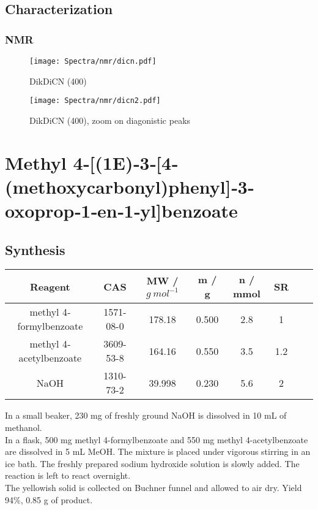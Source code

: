 \documentclass[../Master.tex]{subfiles}
\begin{document}
\subsection{Characterization}
\subsubsection{NMR}
\begin{figure}[h!]
	\centering
	\texttt{[image: Spectra/nmr/dicn.pdf]}
	\caption{DikDiCN \NMR*(400)}
\end{figure}
\begin{figure}[h!]
	\centering
	\texttt{[image: Spectra/nmr/dicn2.pdf]}
	\caption{DikDiCN \NMR*(400), zoom on diagonistic peaks}
\end{figure}
\newpage
\section{Methyl 4‐[(1E)‐3‐[4‐(methoxycarbonyl)phenyl]‐3‐oxoprop‐1‐en‐1‐yl]benzoate}
\subsection{Synthesis}
\begin{center}
	\begin{tabular}[b]{cccccccc}
		\toprule
		Reagent                 & CAS       & MW / \(g \ mol^{-1}\) & m / g & n / mmol & SR  \\
		\midrule
		methyl 4‐formylbenzoate & 1571-08-0 & 178.18                & 0.500 & 2.8      & 1   \\
		methyl 4‐acetylbenzoate & 3609-53-8 & 164.16                & 0.550 & 3.5      & 1.2 \\
		NaOH                    & 1310-73-2 & 39.998                & 0.230 & 5.6      & 2   \\
		\bottomrule
	\end{tabular}
\end{center}

In a small beaker, 230 mg of freshly ground NaOH is dissolved in 10 mL of methanol. \\
In a flask, 500 mg methyl 4-formylbenzoate and 550 mg methyl 4-acetylbenzoate are dissolved in 5 mL MeOH. The mixture is placed under vigorous stirring in an ice bath. The freshly prepared sodium hydroxide solution is slowly added. The reaction is left to react overnight. \\
The yellowish solid is collected on Buchner funnel and allowed to air dry. Yield 94\%, 0.85 g of product.
\end{document}
